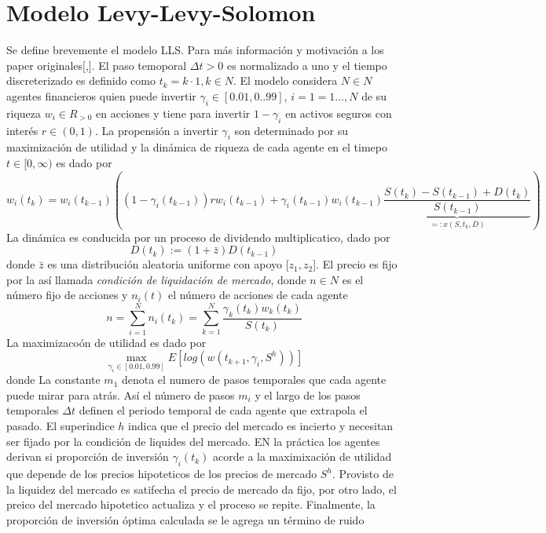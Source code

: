\documentclass[12pt,a4paper]{article}
\begin{document}
\section*{Modelo Levy-Levy-Solomon}
\quad Se define brevemente el modelo LLS. Para más información y motivación a los paper originales[\citep{Levy1994},\citep{Levy1995}]. El paso temoporal $\Delta t > 0$ es normalizado a uno y el tiempo discreterizado es definido como $t_k=k\cdot 1, k \in N$. El modelo considera $N\in N$ agentes financieros quien puede invertir $\gamma_i \in [0.01,0..99]$, $i=1=1\dots,N$ de su riqueza $w_i \in R_{>0}$ en acciones y tiene para invertir $1-\gamma_i$ en activos seguros con interés $r\in (0,1)$. La propensión a invertir $\gamma_i$ son determinado por su maximización de utilidad y la dinámica de riqueza de cada agente en el timepo $t\in[0,\infty)$ es dado por
$$
w_i(t_k)=w_i(t_{k-1})\left((1-\gamma_i(t_{k-1}))rw_i(t_{k-1})+\gamma_i(t_{k-1})w_{i}(t_{k-1})\underbrace{\frac{S(t_k)-S(t_{k-1})+D(t_k)}{S(t_{k-1})}}_{=:x(S, t_k,D)} \right)
$$ 
\quad La dinámica es conducida por un proceso de dividendo multiplicatico, dado por
\begin{equation}
D(t_{k}):=(1+\bar{z})D(t_{k-1})
\end{equation}
donde $\bar{z}$ es una distribución aleatoria uniforme con apoyo [$z_1,z_2$]. El precio es fijo por la así llamada \textit{condición de liquidación de mercado}, donde $n\in N$ es el número fijo de acciones y $n_{i}(t)$ el número de acciones de cada agente
\begin{equation}
n=\sum^{N}_{i=1}n_i(t_k)=\sum^{N}_{k=1}\frac{\gamma_k(t_k)w_k(t_k)}{S(t_k)}\label{2020.1}
\end{equation}
La maximizacoón de utilidad es dado por
$$
\max_{\gamma_i\in[0.01,0.99]} E[log(w(t_{k+1},\gamma_i,S^{h}))]
$$
donde
La constante $m_1$ denota el numero de pasos temporales que cada agente puede mirar para atrás. Así el número de pasos $m_i$ y el largo de los pasos temporales $\Delta t$ definen el periodo temporal de cada agente que extrapola el pasado. El superindice $h$ indica que el precio del mercado es incierto y necesitan ser fijado por la condición de liquides del mercado. EN la práctica los agentes derivan si proporción de inversión $\gamma_i(t_k)$ acorde a la maximixación de utilidad que depende de los precios hipoteticos de los precios de mercado $S^h$. Provisto de la liquidez del mercado es satifecha el precio de mercado da fijo, por otro lado, el preico del mercado hipotetico actualiza y el proceso se repite. Finalmente, la proporción de inversión óptima calculada se le agrega un término de ruido
\end{document}
